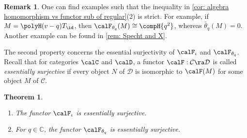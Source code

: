\documentclass[12pt, reqno]{amsart}
\theoremstyle{plain}
\newtheorem{theorem}{Theorem}[section]
\theoremstyle{definition}
\newtheorem{remark}[remark]{Remark}
\numberwithin{equation}{section}
\numberwithin{figure}{section}
\numberwithin{table}{section}
\def\C{\mathbb C}
\begin{document}
\begin{remark}
One can find examples such that the inequality in \cref{cor: algebra homomorphism vs functor sub of regular}(2) is strict. 
For example, if $M = \polyH (v-q) T_{\id}$, then $\calF_{\theta_q}(M) \cong \compH{q^2}$, whereas $\widetilde{\theta_q}(M) = 0$.
Another example can be found in \cref{rem: Specht and X}.
\end{remark}











 











The second property concerns the essential surjectivity of $\calF_\iota$ and $\calF_{\theta_q}$.
Recall that for categories $\calC$ and $\calD$, a functor $\calF: \mathcal C \ra \mathcal D$ is called \emph{essentially surjective} if every object $N$ of $\mathcal D$ is isomorphic to $\calF(M)$ for some object $M$ of $\mathcal C$.


\begin{theorem}\label{thm: essential surjectiveness}
\begin{enumerate}[label = {\rm (\arabic*)}]
    \item  The functor $\calF_\iota$ is essentially surjective.
    \item 
For $q \in \C$, the functor $\calF_{\theta_q}$ is essentially surjective.
\end{enumerate}
\end{theorem}
\end{document}
